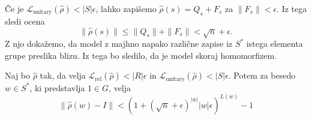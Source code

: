 \documentclass[mat2, tisk]{fmfdelo}
\newcommand{\Loss}[1]{\mathcal L _\text{#1}}
\newcommand{\s}{\hat \rho (s)}
\begin{document}
Če je $\Loss{unitary}(\hat\rho) < |S|\epsilon$, lahko zapišemo
$\s = Q_s + F_s$ za $\|F_s\| < \epsilon$. Iz tega sledi ocena
%
$$
\|\s\| \leq \|Q_s\| + \|F_s\| < \sqrt{n} + \epsilon.
$$
Z njo dokažemo, da model z majhno napako
različne zapise iz $S^*$ istega elementa grupe preslika
blizu. Iz tega bo sledilo, da je model skoraj homomorfizem.
%
\begin{lema}
  \label{lema : zveznost na besedah}
  Naj bo $\hat \rho$ tak, da velja
  $\Loss{rel}(\hat \rho) < |R| \epsilon$ in $
  \Loss{unitary}(\hat \rho)  < |S| \epsilon$.
  Potem za besedo $w \in S^*$, ki predstavlja $1 \in G$, velja
  $$
  \|\hat \rho(w) - I\| <\left( 1 + (\sqrt{n} +
  \epsilon)^{|w|} |w| \epsilon \right)^{L(w)} - 1
  $$
\end{lema}
\end{document}
